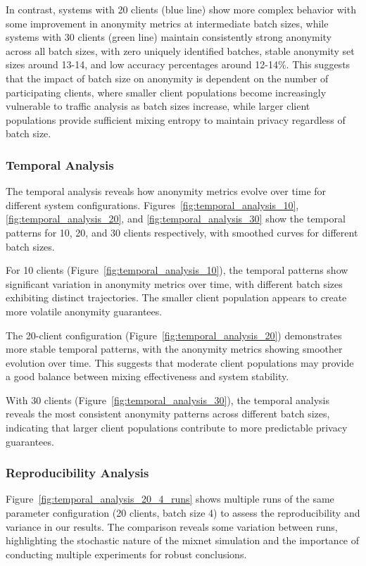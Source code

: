 \documentclass{article}
\begin{document}
In contrast, systems with 20 clients (blue line) show more 
complex behavior with some improvement in anonymity metrics 
at intermediate batch sizes, while systems with 30 clients 
(green line) maintain consistently strong anonymity across 
all batch sizes, with zero uniquely identified batches, 
stable anonymity set sizes around 13-14, and low accuracy 
percentages around 12-14\%. This suggests that the impact 
of batch size on anonymity is dependent on the number 
of participating clients, where smaller client populations 
become increasingly vulnerable to traffic analysis as batch 
sizes increase, while larger client populations provide 
sufficient mixing entropy to maintain privacy regardless 
of batch size.


\subsubsection{Temporal Analysis}

The temporal analysis reveals how anonymity metrics evolve 
over time for different system configurations. 
Figures~\ref{fig:temporal_analysis_10}, \ref{fig:temporal_analysis_20}, 
and \ref{fig:temporal_analysis_30} show the temporal patterns 
for 10, 20, and 30 clients respectively, with smoothed curves 
for different batch sizes.

For 10 clients (Figure~\ref{fig:temporal_analysis_10}), 
the temporal patterns show significant variation in anonymity 
metrics over time, with different batch sizes exhibiting 
distinct trajectories. The smaller client population appears 
to create more volatile anonymity guarantees.

The 20-client configuration (Figure~\ref{fig:temporal_analysis_20}) 
demonstrates more stable temporal patterns, with the anonymity 
metrics showing smoother evolution over time. This suggests 
that moderate client populations may provide a good balance 
between mixing effectiveness and system stability.

With 30 clients (Figure~\ref{fig:temporal_analysis_30}), 
the temporal analysis reveals the most consistent anonymity 
patterns across different batch sizes, indicating that larger 
client populations contribute to more predictable privacy guarantees.

\subsubsection{Reproducibility Analysis}

Figure~\ref{fig:temporal_analysis_20_4_runs} shows multiple 
runs of the same parameter configuration (20 clients, batch size 4) 
to assess the reproducibility and variance in our results. 
The comparison reveals some variation between runs, highlighting 
the stochastic nature of the mixnet simulation and the importance 
of conducting multiple experiments for robust conclusions.
\end{document}
